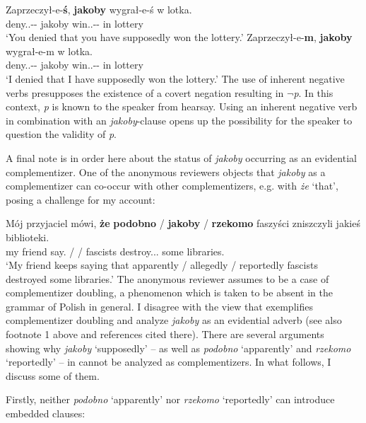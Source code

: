 \documentclass[output=paper
,modfonts
,nonflat]{langsci/langscibook}
\begin{document}
 \ea \ea \gll Zaprzeczył-e-\textbf{ś}, \textbf{jakoby} wygrał-e-ś w lotka.\\
  			deny.{\lptcp}.{\sg}-{\masc}-{\secondperson}{\sg} jakoby win.{\lptcp}.{\sg}-{\masc}-{\secondperson}{\sg} in lottery \\
	\glt	 `You denied that you have supposedly won the lottery.'
		\ex\gll	Zaprzeczył-e-\textbf{m}, \textbf{jakoby} wygrał-e-m w lotka.\\
  			deny.{\lptcp}.{\sg}-{\masc}-{\firstperson}{\sg} jakoby win.{\lptcp}.{\sg}-{\masc}-{\firstperson}{\sg} in lottery \\
	\glt		 `I denied that I have supposedly won the lottery.'
\z\z 
The use of inherent negative verbs presupposes the existence of a covert negation resulting in $\lnot$\emph{p}. In this context, \emph{p} is known to the speaker from hearsay. Using an inherent negative verb in combination with an \emph{jakoby}-clause opens up the possibility for the speaker to question the validity of \emph{p}.

A final note is in order here about the status of \emph{jakoby} occurring as an evidential complementizer. One of the anonymous reviewers objects that \emph{jakoby} as a complementizer can co-occur with other complementizers, e.g. with \emph{że} `that', posing a challenge for my account:

\ea \gll Mój przyjaciel mówi, \textbf{że} \textbf{podobno} / \textbf{jakoby} / \textbf{rzekomo} faszyści zniszczyli jakieś biblioteki.  \label{challenge} \\
		my friend say.{\thirdperson}{\sg} {\comp} {\comp} / {\comp} / {\comp}  fascists destroy.{\lptcp}.{\vir}.{\pl} some libraries. \\
\glt	 `My friend keeps saying that apparently / allegedly / reportedly fascists destroyed some libraries.'
\z
The anonymous reviewer assumes  to be a case of complementizer doubling, a phenomenon which is taken to be absent in the grammar of Polish in general. I disagree with the view that  exemplifies complementizer doubling and analyze \emph{jakoby}  as an evidential adverb (see also footnote 1 above and references cited there). There are several arguments showing why \emph{jakoby}  `supposedly' – as well as \emph{podobno} `apparently' and \emph{rzekomo} `reportedly' – in  cannot be analyzed as  complementizers. In what follows, I discuss some of them.

Firstly, neither \emph{podobno}  `apparently' nor \emph{rzekomo} `reportedly' can introduce embedded clauses:
\end{document}

